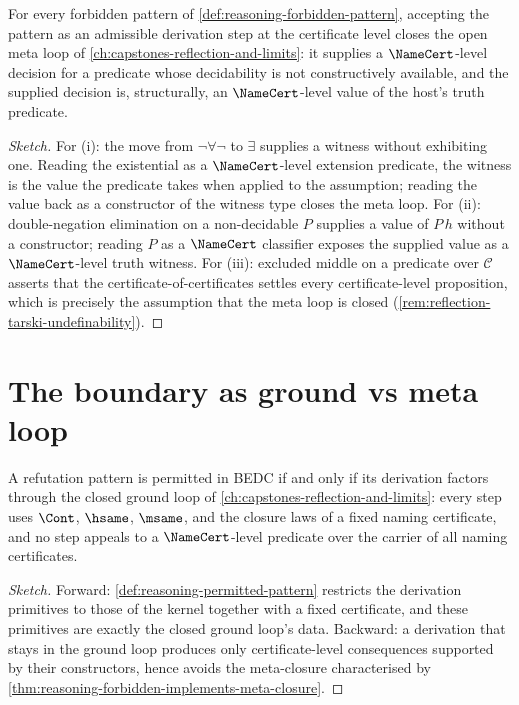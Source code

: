 \begin{theorem}
\label{thm:reasoning-forbidden-implements-meta-closure}
For every forbidden pattern of \autoref{def:reasoning-forbidden-pattern}, accepting the pattern as an admissible derivation step at the certificate level closes the open meta loop of \autoref{ch:capstones-reflection-and-limits}: it supplies a $\NameCert$-level decision for a predicate whose decidability is not constructively available, and the supplied decision is, structurally, an $\NameCert$-level value of the host's truth predicate.
\end{theorem}

\begin{proof}[Sketch]
For (i): the move from $\neg \forall \neg$ to $\exists$ supplies a witness without exhibiting one. Reading the existential as a $\NameCert$-level extension predicate, the witness is the value the predicate takes when applied to the assumption; reading the value back as a constructor of the witness type closes the meta loop. For (ii): double-negation elimination on a non-decidable $P$ supplies a value of $P\,h$ without a constructor; reading $P$ as a $\NameCert$ classifier exposes the supplied value as a $\NameCert$-level truth witness. For (iii): excluded middle on a predicate over $\mathcal{C}$ asserts that the certificate-of-certificates settles every certificate-level proposition, which is precisely the assumption that the meta loop is closed (\autoref{rem:reflection-tarski-undefinability}).
\end{proof}

\section{The boundary as ground vs meta loop}
\label{sec:reasoning-boundary}

\begin{theorem}
\label{thm:reasoning-permitted-iff-ground}
A refutation pattern is permitted in BEDC if and only if its derivation factors through the closed ground loop of \autoref{ch:capstones-reflection-and-limits}: every step uses $\Cont$, $\hsame$, $\msame$, and the closure laws of a fixed naming certificate, and no step appeals to a $\NameCert$-level predicate over the carrier of all naming certificates.
\end{theorem}

\begin{proof}[Sketch]
Forward: \autoref{def:reasoning-permitted-pattern} restricts the derivation primitives to those of the kernel together with a fixed certificate, and these primitives are exactly the closed ground loop's data. Backward: a derivation that stays in the ground loop produces only certificate-level consequences supported by their constructors, hence avoids the meta-closure characterised by \autoref{thm:reasoning-forbidden-implements-meta-closure}.
\end{proof}

